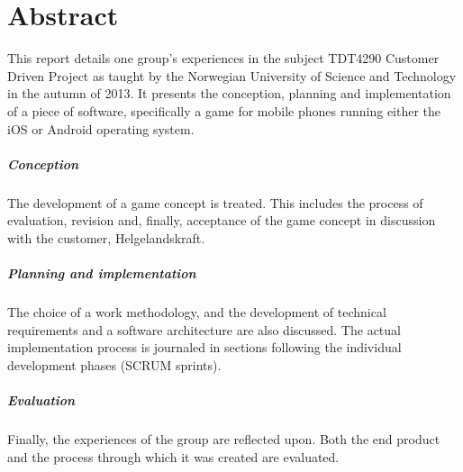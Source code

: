
\chapter*{Abstract}

This report details one group's experiences in the subject TDT4290 Customer
Driven Project as taught by the Norwegian University of Science and Technology
in the autumn of 2013. It presents the conception, planning and implementation
of a piece of software, specifically a game for mobile phones running either
the iOS or Android operating system.

\paragraph{Conception}
The development of a game concept is treated. This includes the process of
evaluation, revision and, finally, acceptance of the game concept in discussion
with the customer, Helgelandskraft.

\paragraph{Planning and implementation}
The choice of a work methodology, and the development of technical requirements
and a software architecture are also discussed. The actual implementation
process is journaled in sections following the individual development phases
(SCRUM sprints).

\paragraph{Evaluation}
Finally, the experiences of the group are reflected upon. Both the end product
and the process through which it was created are evaluated.
